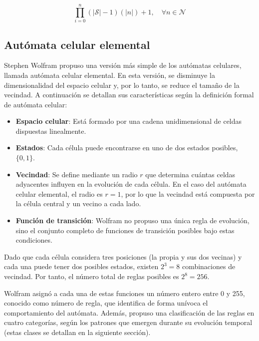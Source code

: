 \begin{equation}
	\prod_{i = 0}^{n} (|\mathcal{S}| - 1)(|n|) + 1, \quad \forall n \in \mathcal{N}
	\label{eq:semitotalistica}
\end{equation}

\subsection{Autómata celular elemental}

Stephen Wolfram propuso una versión más simple de los autómatas celulares, llamada autómata celular elemental. En esta versión, se disminuye la dimensionalidad del espacio celular y, por lo tanto, se reduce el tamaño de la vecindad. A continuación se detallan sus características según la definición formal de autómata celular:

\begin{itemize}
	
	\item \textbf{Espacio celular}: Está formado por una cadena unidimensional de celdas dispuestas linealmente.
	
	
	
	\item \textbf{Estados}: Cada célula puede encontrarse en uno de dos estados posibles, $\{0, 1\}$.
	
	
	
	\item \textbf{Vecindad}: Se define mediante un radio $r$ que determina cuántas celdas adyacentes influyen en la evolución de cada célula. En el caso del autómata celular elemental, el radio es $r = 1$, por lo que la vecindad está compuesta por la célula central y un vecino a cada lado.
	
	
	
	\item \textbf{Función de transición}: Wolfram no propuso una única regla de evolución, sino el conjunto completo de funciones de transición posibles bajo estas condiciones.
	
	
	
\end{itemize}

Dado que cada célula considera tres posiciones (la propia y sus dos vecinas) y cada una puede tener dos posibles estados, existen $2^3 = 8$ combinaciones de vecindad. Por tanto, el número total de reglas posibles es $2^{8} = 256$.

Wolfram asignó a cada una de estas funciones un número entero entre 0 y 255, conocido como número de regla, que identifica de forma unívoca el comportamiento del autómata. Además, propuso una clasificación de las reglas en cuatro categorías, según los patrones que emergen durante su evolución temporal (estas clases se detallan en la siguiente sección).

